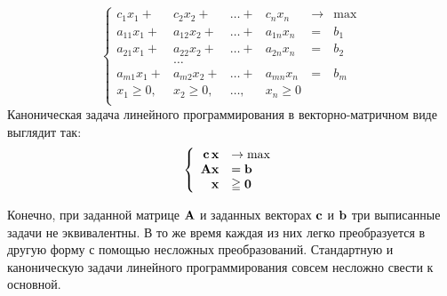 \begin{equation}\label{KZLP}
 \left\{
\begin{array}{rrrrllll}
     c_1 x_1 + & c_2 x_2 +    & \ldots +& c_n x_n &\to & \max\\
     a_{11} x_1 + & a_{12} x_2 + &\ldots +& a_{1n} x_n &=& b_1 \\
     a_{21} x_1 + & a_{22} x_2 + &\ldots +& a_{2n} x_n &=& b_2\\
                      & \ldots &&&&\\
     a_{m1} x_1 + & a_{m2} x_2 +& \ldots +& a_{mn} x_n &=& b_m\\
     x_1 \geqslant 0,   & x_2 \geqslant 0,  & \ldots,&  x_n \geqslant 0\\
\end{array} \right.
\end{equation}
Каноническая задача линейного программирования в векторно-матричном
виде выглядит так:
\begin{equation}\label{KZLPV}
\left\{
\begin{array}{rl}
 \mathbf{c} \, \mathbf{x} & \to \max  \\
 \mathbf{A} \mathbf{x} &= \mathbf{b} \\
 \mathbf{x} &\geqq \mathbf{0}\\
\end{array} \right.
\end{equation}

Конечно, при заданной матрице $\mathbf{A}$ и заданных векторах $\mathbf{c}$
и $\mathbf{b}$ три выписанные задачи не эквивалентны. В то же время
каждая из них легко преобразуется в другую форму с помощью несложных
преобразований. Стандартную и каноническую задачи линейного
программирования совсем несложно свести к  основной.


